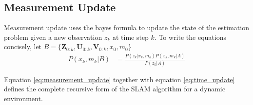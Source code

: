 \documentclass[10pt,twocolumn,letterpaper]{article}
\begin{document}
\subsection{Measurement Update} Measurement update uses the bayes formula to update the state of the estimation problem given a new observation $z_k$ at time step $k$. To write the equations concisely, let $B =\{ \mathbf{Z}_{0:k},\mathbf{U}_{0:k},\mathbf{V}_{0:k},x_0,m_0 \}$
 \begin{align}
P(x_k,m_k|B) %
&=\frac{P(z_k|x_k,m_k)P(x_k,m_k|A)}{P(z_k|A)}
\label{eq:measurement_update}
\end{align}

Equation \ref{eq:measurement_update} together with equation \ref{eq:time_update} defines the complete recursive form of the SLAM algorithm for a dynamic environment. 
\end{document}
